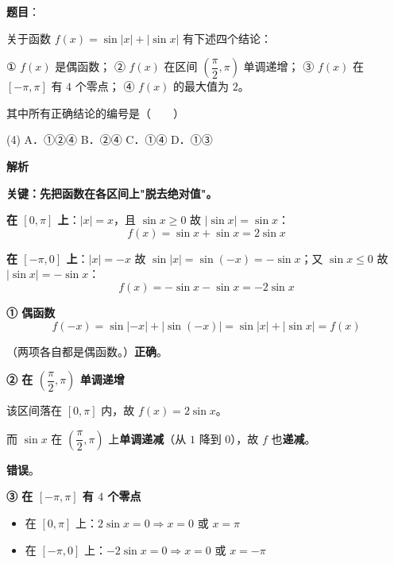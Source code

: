 \begin{answer}

\textbf{题目}：

关于函数 $f(x)=\sin|x|+|\sin x|$ 有下述四个结论：

  ① $f(x)$ 是偶函数；
  ② $f(x)$ 在区间 $\left(\dfrac\pi2,\pi\right)$ 单调递增；
  ③ $f(x)$ 在 $[-\pi,\pi]$ 有 $4$ 个零点；
  ④ $f(x)$ 的最大值为 $2$。

其中所有正确结论的编号是\mbox{（　　）}

\begin{gkopts}(4)
\task A．①②④
\task B．②④
\task C．①④
\task D．①③
\end{gkopts}

\textbf{解析}

\textbf{关键：先把函数在各区间上"脱去绝对值"。}

\textbf{在 $[0,\pi]$ 上}：$|x|=x$，且 $\sin x\ge0$ 故 $|\sin x|=\sin x$：
\nopagebreak[4]
\[f(x)=\sin x+\sin x=2\sin x\]

\textbf{在 $[-\pi,0]$ 上}：$|x|=-x$ 故 $\sin|x|=\sin(-x)=-\sin x$；又 $\sin x\le0$ 故 $|\sin x|=-\sin x$：
\nopagebreak[4]
\[f(x)=-\sin x-\sin x=-2\sin x\]

\par\medskip

\textbf{① 偶函数 }
\nopagebreak[4]
\[f(-x)=\sin|-x|+|\sin(-x)|=\sin|x|+|\sin x|=f(x)\]

（两项各自都是偶函数。）\textbf{正确}。

\par\medskip

\textbf{② 在 $\left(\dfrac\pi2,\pi\right)$ 单调递增 }

该区间落在 $[0,\pi]$ 内，故 $f(x)=2\sin x$。

而 $\sin x$ 在 $\left(\dfrac\pi2,\pi\right)$ 上\textbf{单调递减}（从 $1$ 降到 $0$），故 $f$ 也\textbf{递减}。

\textbf{错误}。

\par\medskip

\textbf{③ 在 $[-\pi,\pi]$ 有 $4$ 个零点 }

\begin{itemize}
\item 在 $[0,\pi]$ 上：$2\sin x=0\Rightarrow x=0$ 或 $x=\pi$
\item 在 $[-\pi,0]$ 上：$-2\sin x=0\Rightarrow x=0$ 或 $x=-\pi$
\end{itemize}


\end{answer}
